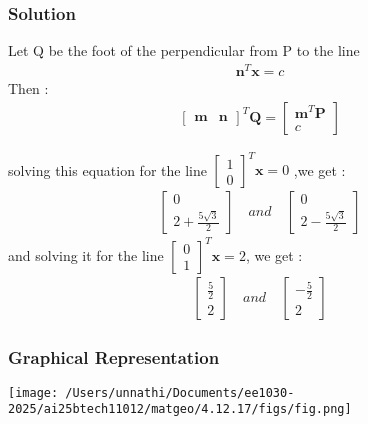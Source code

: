 \documentclass{beamer}
\begin{document}
\begin{frame}
\frametitle{Solution}
Let Q be the foot of the perpendicular from P to the line
\begin{align}
    \textbf{n}^{T}\textbf{x} = c
\end{align}
Then :
\begin{align}
    \begin{bmatrix}\textbf{m}&\textbf{n}\end{bmatrix}^{T}\textbf{Q} = \begin{bmatrix}\textbf{m}^{T}\textbf{P}\\c\end{bmatrix}
\end{align}

solving this equation for the line $\begin{bmatrix}1\\0\end{bmatrix}^{T}\textbf{x} = 0$ ,we get :
\begin{align}
    \begin{bmatrix}0\\2+\frac{5\sqrt{3}}{2}\end{bmatrix} \quad and \quad \begin{bmatrix}0\\2-\frac{5\sqrt{3}}{2}\end{bmatrix}
\end{align}
and solving it for the line $\begin{bmatrix}0\\1\end{bmatrix}^{T}\textbf{x} = 2$, we get :
\begin{align}
    \begin{bmatrix}\frac{5}{2} \\ 2\end{bmatrix} \quad and \quad \begin{bmatrix}-\frac{5}{2} \\ 2\end{bmatrix}
\end{align}


\end{frame}
\begin{frame}

\frametitle{Graphical Representation}
\begin{center}
\texttt{[image: /Users/unnathi/Documents/ee1030-2025/ai25btech11012/matgeo/4.12.17/figs/fig.png]}
\end{center}
\end{frame}
\end{document}
